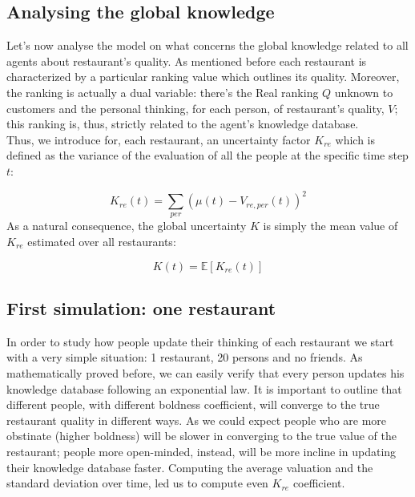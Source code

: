 \documentclass[10pt,a4paper,usenatbib]{article}
\begin{document}
\subsection{Analysing the global knowledge}
Let’s now analyse the model on what concerns the global knowledge related to all agents about restaurant’s quality. As mentioned before each restaurant is characterized by a particular ranking value which outlines its quality. Moreover, the ranking is actually a dual variable: there’s the Real ranking $Q$ unknown to customers and the personal thinking, for each person, of restaurant’s quality, $V$; this ranking is, thus, strictly related to the agent’s knowledge database.\\
Thus, we introduce for, each restaurant, an uncertainty factor $K_{re}$ which is defined as the variance of the evaluation of all the people at the specific time step $t$:

\begin{equation}
  {K_{re}}\left( t \right) = {\sum\limits_{per} {\left( {\mu \left( t \right) - {V_{re,per}}\left( t \right)} \right)} ^2}
\end{equation}
As a natural consequence, the global uncertainty $K$ is simply the mean value of $K_{re}$ estimated over all restaurants: 

\begin{equation}
  K\left( t \right) = \mathbb{E}\left[ {{K_{re}}\left( t \right)} \right]
\end{equation}



\subsection{First simulation: one restaurant}
\label{subsec:first_sim}

In order to study how people update their thinking of each restaurant we start with a very simple situation: 1 restaurant, 20 persons and no friends. As  mathematically proved before, we can easily verify that every person updates his knowledge database following an exponential law.
It is important to outline that different people, with different boldness coefficient, will converge to the true restaurant quality in different ways. As we could expect people who are more obstinate (higher boldness) will be slower in converging to the true value of the restaurant; people more open-minded, instead, will be more incline in updating their knowledge database faster.
Computing the average valuation and the standard deviation over time, led us to compute even $K_{re}$ coefficient. 
\end{document}
